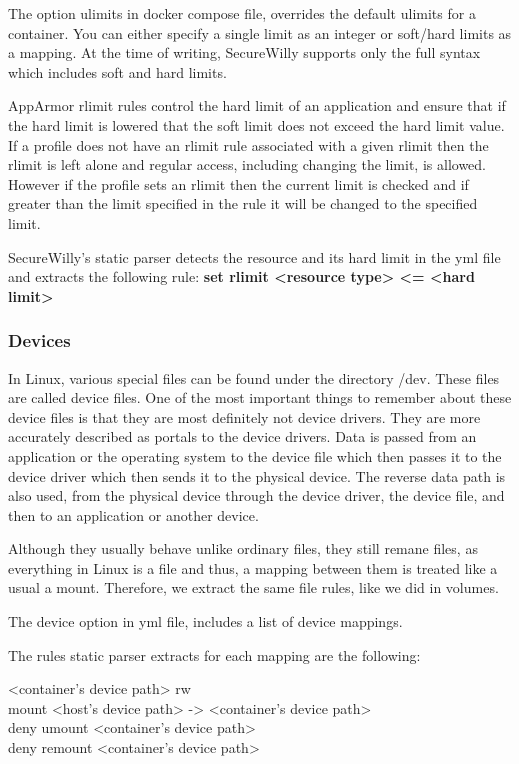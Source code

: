 The option ulimits in docker compose file, overrides the default ulimits for a container. You can either specify a single limit as an integer or soft/hard limits as a mapping. At the time of writing, SecureWilly supports only the full syntax which includes soft and hard limits. 

AppArmor rlimit rules control the hard limit of an application and ensure that if the hard limit is lowered that the soft limit does not exceed the hard limit value. If a profile does not have an rlimit rule associated with a given rlimit then the rlimit is left alone and regular access, including changing the limit, is allowed. However if the profile sets an rlimit then the current limit is checked and if greater than the limit specified in the rule it will be changed to the specified limit.

SecureWilly's static parser detects the resource and its hard limit in the yml file and extracts the following rule:
\textbf{set rlimit \textless resource type\textgreater{} \textless = \textless hard limit\textgreater{}}

\subsubsection{Devices}
In Linux, various special files can be found under the directory /dev. These files are called device files. One of the most important things to remember about these device files is that they are most definitely not device drivers. They are more accurately described as portals to the device drivers. Data is passed from an application or the operating system to the device file which then passes it to the device driver which then sends it to the physical device. The reverse data path is also used, from the physical device through the device driver, the device file, and then to an application or another device. \cite{devices}

Although they usually behave unlike ordinary files, they still remane files, as everything in Linux is a file and thus, a mapping between them is treated like a usual a mount. Therefore, we extract the same file rules, like we did in volumes.

The device option in yml file, includes a list of device mappings.

The rules static parser extracts for each mapping are the following:
\begin{description}
\item[\textless container's device path\textgreater{} rw]
\item[mount \textless host's device path\textgreater{} -\textgreater{} \textless container's device path\textgreater{}]
\item[deny umount \textless container's device path\textgreater{}]
\item[deny remount \textless container's device path\textgreater{}]
\end{description}

